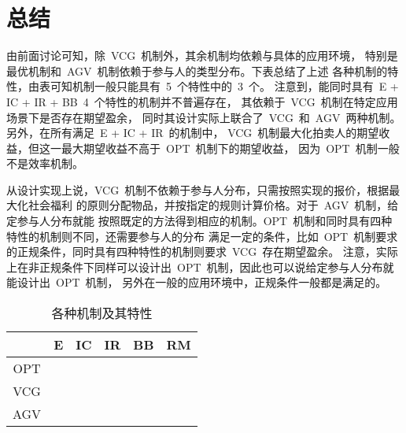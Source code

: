 \documentclass[a4paper,12pt]{article}
\begin{document}
\section{总结} 

由前面讨论可知，除~VCG~机制外，其余机制均依赖与具体的应用环境，
特别是最优机制和~AGV~机制依赖于参与人的类型分布。下表总结了上述
各种机制的特性，由表可知机制一般只能具有~5~个特性中的~3~个。
注意到，能同时具有~E + IC + IR + BB~4~个特性的机制并不普遍存在，
其依赖于~VCG~机制在特定应用场景下是否存在期望盈余，
同时其设计实际上联合了~VCG~和~AGV~两种机制。另外，在所有满足~E + IC + IR~的机制中，
VCG~机制最大化拍卖人的期望收益，但这一最大期望收益不高于~OPT~机制下的期望收益，
因为~OPT~机制一般不是效率机制。

从设计实现上说，VCG~机制不依赖于参与人分布，只需按照实现的报价，根据最大化社会福利
的原则分配物品，并按指定的规则计算价格。对于~AGV~机制，给定参与人分布就能
按照既定的方法得到相应的机制。OPT~机制和同时具有四种特性的机制则不同，还需要参与人的分布
满足一定的条件，比如~OPT~机制要求的正规条件，同时具有四种特性的机制则要求~VCG~存在期望盈余。
注意，实际上在非正规条件下同样可以设计出~OPT~机制，因此也可以说给定参与人分布就能设计出~OPT~机制，
另外在一般的应用环境中，正规条件一般都是满足的。

\begin{table}[!h]
    \caption{各种机制及其特性}
    \vspace{.2cm}
    \centering 
    \begin{tabular}{c|ccccc}
	\hline
	    & E & IC & IR & BB & RM \\
	\hline
	OPT &            & \checkmark  & \checkmark  &              & \checkmark  \\
	VCG & \checkmark & \checkmark  & \checkmark  &              &    \\
	AGV & \checkmark & \checkmark  &             &  \checkmark  &    \\
	\hline
    \end{tabular}
\end{table}
\end{document}
